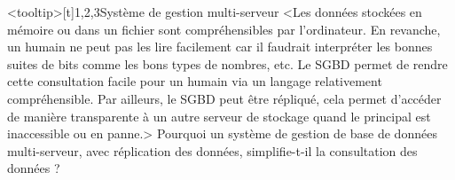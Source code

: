 \begin{quiz}[title={Bases de données}]
\begin{quizquestion}<tooltip>[t]{1,2,3}{}{Système de gestion multi-serveur}
<Les données stockées en mémoire ou dans un fichier sont compréhensibles par l'ordinateur. En revanche, un humain ne peut pas les lire facilement car il faudrait interpréter les bonnes suites de bits comme les bons types de nombres, etc. Le SGBD permet de rendre cette consultation facile pour un humain via un langage relativement compréhensible.
Par ailleurs, le SGBD peut être répliqué, cela permet d'accéder de manière transparente à un autre serveur de stockage quand le principal est inaccessible ou en panne.>
Pourquoi un système de gestion de base de données multi-serveur, avec réplication des données, simplifie-t-il la consultation des données ? %
\end{quizquestion}
\end{quiz}
